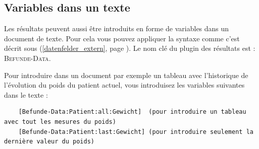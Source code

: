 \subsection{Variables dans un texte}
 
Les résultats peuvent aussi être introduits en forme de variables dans un document de texte. Pour cela vous pouvez appliquer la syntaxe comme c'est décrit sous (\ref{datenfelder_extern}, page \pageref{datenfelder_extern}). Le nom clé du plugin des résultats est : \textsc{Befunde-Data}.

Pour introduire dans un document par exemple un tableau avec l'historique de l'évolution du poids du patient actuel, vous introduisez les variables suivantes dans le texte :
\begin{verbatim}
    [Befunde-Data:Patient:all:Gewicht]  (pour introduire un tableau avec tout les mesures du poids)
    [Befunde-Data:Patient:last:Gewicht] (pour introduire seulement la dernière valeur du poids)
\end{verbatim}
